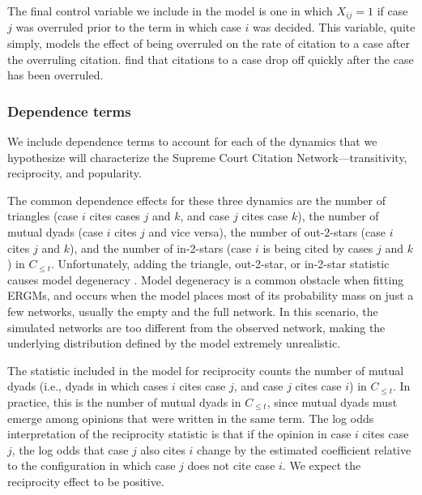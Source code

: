 \documentclass{cup-pan}
\begin{document}
The final control variable we include in the model is one in which $X_{ij} = 1$ if case $j$ was overruled prior to the term in which case $i$ was decided. This variable, quite simply, models the effect of being overruled on the rate of citation to a case after the overruling citation. \citet{fowler2008authority} find that citations to a case drop off quickly after the case has been overruled.


\subsubsection{Dependence terms}\label{dependence_terms}

We include dependence terms to account for each of the dynamics that we hypothesize will characterize the Supreme Court Citation Network---transitivity, reciprocity, and popularity. %

The common dependence effects for these three dynamics are the number of triangles (case $i$ cites cases $j$ and $k$, and case $j$ cites case $k$), the number of mutual dyads (case $i$ cites $j$ and vice versa), the number of out-2-stars (case $i$ cites $j$ and $k$), and the number of in-2-stars (case $i$ is being cited by cases $j$ and $k$) in $C_{\leq t}$. Unfortunately, adding the triangle, out-2-star, or in-2-star statistic causes model degeneracy \citep{Handcock.2003}. Model degeneracy is a common obstacle when fitting ERGMs, and occurs when the model places most of its probability mass on just a few networks, usually the empty and the full network. In this scenario, the simulated networks are too different from the observed network, making the underlying distribution defined by the model extremely unrealistic.

The statistic included in the model for reciprocity counts the number of mutual dyads (i.e., dyads in which cases $i$ cites case $j$, and case $j$ cites case $i$) in $C_{\leq t}$. In practice, this is the number of mutual dyads in $C_{\leq t}$, since mutual dyads must emerge among opinions that were written in the same term. The log odds interpretation of the reciprocity statistic is that if the opinion in case $i$ cites case $j$, the log odds that case $j$ also cites $i$ change by the estimated coefficient relative to the configuration in which case $j$ does not cite case $i$. We expect the reciprocity effect to be positive.
\end{document}
